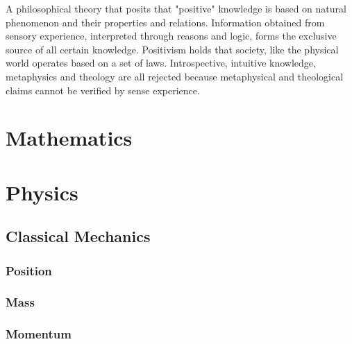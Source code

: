 \documentclass{article}
\newcounter{subsubsubsection}[subsubsection]
\begin{document}

A philosophical theory that posits that "positive" knowledge is based on natural phenomenon and their properties and relations. Information obtained from sensory experience, interpreted through reasons and logic, forms the exclusive source of all certain knowledge. Positivism holds that society, like the physical world operates based on a set of laws. Introspective, intuitive knowledge, metaphysics and theology are all rejected because metaphysical and theological claims cannot be verified by sense experience.






\newpage






\section{Mathematics}

\newpage







\section{Physics}

\subsection{Classical Mechanics}

\subsubsection{Position}

\newpage

\subsubsection{Mass}

\newpage

\subsubsection{Momentum}
\end{document}
